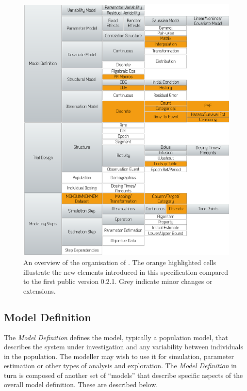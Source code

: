 \begin{figure}[htb!]
 \centering
  \includegraphics[height=0.85\textheight]{pics/PharmMLschemaOverview} %
  \caption{An overview of the organisation of \pharmml. The orange highlighted cells illustrate the 
  	new elements introduced in this specification compared to the first public version 0.2.1. 
	Grey indicate minor changes or extensions.}
  \label{fig:momloverview}
\end{figure}

\subsection{Model Definition}

The \emph{Model Definition} defines the model, typically a population
model, that describes the system under investigation and any variability
between individuals in the population. The modeller may wish to use
it for simulation, parameter estimation or other types of analysis and
exploration. The \emph{Model Definition} in turn is composed of another
set of ``models'' that describe specific aspects of the overall model
definition. These are described below.


